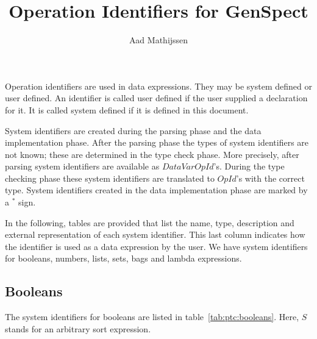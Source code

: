 \documentclass[a4paper,fleqn]{article}
\title{Operation Identifiers for GenSpect}
\author{Aad Mathijssen}
\newcommand{\frm}[1]{\mbox{\ensuremath{#1}}}
\newcommand{\f}[1]{\ensuremath{\mathit{#1}}}
\begin{document}
\maketitle

\noindent
Operation identifiers are used in data expressions. They may be system defined
or user defined. An identifier is called user defined if the user supplied a
declaration for it. It is called system defined if it is defined in this
document.

System identifiers are created during the parsing phase and the data
implementation phase. After the parsing phase the types of system identifiers
are not known; these are determined in the type check phase. More precisely,
after parsing system identifiers are available as \f{DataVarOpId}'s. During the
type checking phase these system identifiers are translated to \f{OpId}'s with
the correct type. System identifiers created in the data implementation phase
are marked by a \frm{^*} sign.

In the following, tables are provided that list the name, type, description and
external representation of each system identifier. This last column indicates
how the identifier is used as a data expression by the user. We have system
identifiers for booleans, numbers, lists, sets, bags and lambda expressions.

\subsection*{Booleans}

The system identifiers for booleans are listed in table~\ref{tab:ptc:booleans}.
Here, \frm{S} stands for an arbitrary sort expression.
\end{document}
